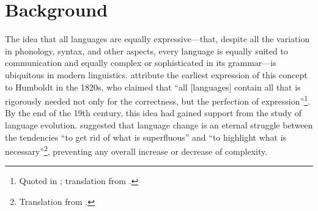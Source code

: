 \documentclass[12pt,twoside,leqno]{article} %
\newcommand*{\tocref}[1]{\hyperref[{#1}]{\ref*{#1}.~\nameref*{#1}}}
\begin{document}

\section{Background}
\label{sec:bg}

The idea that all languages are equally expressive---that, despite all the variation in phonology, syntax, and other aspects, every language is equally suited to communication and equally complex or sophisticated in its grammar---is ubiquitous in modern linguistics. \citet{joseph} attribute the earliest expression of this concept to Humboldt in the 1820s, who claimed that ``all [languages] contain all that is rigorously needed not only for the correctness, but the perfection of expression''\footnote{Quoted in \citet[8]{rémusat}; translation from \citet[344]{joseph}.}. By the end of the 19th century, this idea had gained support from the study of language evolution. \citet[227]{passy} suggested that language change is an eternal struggle between the tendencies ``to get rid of what is superfluous'' and ``to highlight what is necessary''\footnote{Translation from \citet[352]{joseph}.}, preventing any overall increase or decrease of complexity.
\end{document}
